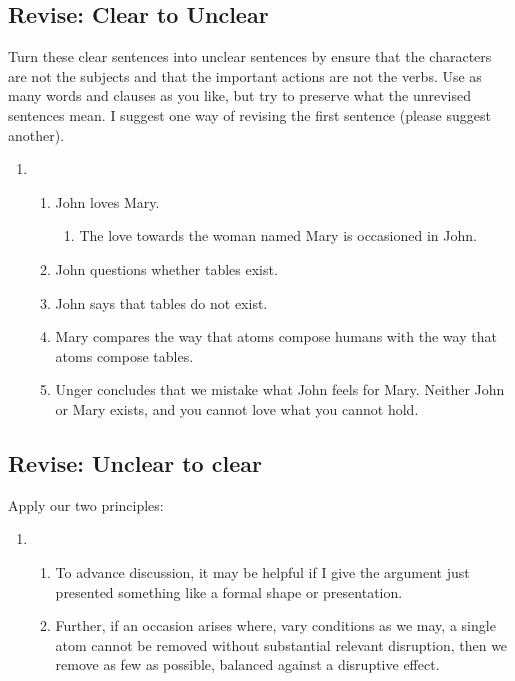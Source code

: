 \documentclass[10pt, oneside]{article}
\begin{document}
\subsection{Revise: Clear to Unclear} Turn these clear sentences into unclear sentences by ensure that the characters are not the subjects and that the important actions are not the verbs. Use as many words and clauses as you like, but try to preserve what the unrevised sentences mean. I suggest one way of revising the first sentence (please suggest another).\\
\begin{enumerate}
\item{}
\begin{enumerate}
\item John loves Mary.
\begin{enumerate}
\item The love towards the woman named Mary is occasioned in John.
\vspace{20mm}
\end{enumerate}
\item John questions whether tables exist.
\vspace{20mm}
\item John says that tables do not exist.
\vspace{20mm}
\item Mary compares the way that atoms compose humans with the way that atoms compose tables. \vspace{20mm}
\item Unger concludes that we mistake what John feels for Mary. Neither John or Mary exists, and you cannot love what you cannot hold.
\end{enumerate}

\end{enumerate}

\subsection{Revise: Unclear to clear} Apply our two principles:
\begin{enumerate}
\item{}
\begin{enumerate}
\item To advance discussion, it may be helpful if I give the argument just presented something like a formal shape or presentation.
\vspace{20mm}
\item Further, if an occasion arises where, vary conditions as we may, a single atom cannot be removed without substantial relevant disruption, then we remove as few as possible, balanced against a disruptive effect.\vspace{20mm}
\end{enumerate}
\end{enumerate}
\end{document}
